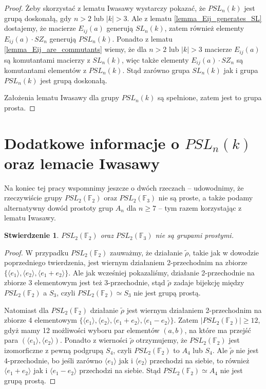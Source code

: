 \documentclass[licencjacka]{pracamgr}
\newtheorem{fact}{Stwierdzenie}[section]
\begin{document}
\begin{proof}
  Żeby skorzystać z lematu Iwasawy wystarczy pokazać, że $PSL_n(k)$ jest grupą doskonałą, 
  gdy $n > 2$ lub $|k| > 3$.
  Ale z lematu \ref{lemma_Eij_generates_SL} dostajemy, że macierze $E_{i j}(a)$ generują $SL_n(k)$,
  zatem również elementy $E_{i j}(a) \cdot SZ_n$ generują $PSL_n(k)$.
  Ponadto z lematu \ref{lemma_Eij_are_commutants} wiemy, że dla $n > 2$ lub $|k| > 3$ macierze $E_{i j}(a)$ 
  są komutantami macierzy z $SL_n(k)$, więc także elementy $E_{i j}(a) \cdot SZ_n$ są komutantami elementów z $PSL_n(k)$.
  Stąd zarówno grupa $SL_n(k)$ jak i grupa $PSL_n(k)$ jest grupą doskonałą.
  
  Założenia lematu Iwasawy dla grupy $PSL_n(k)$ są spełnione, zatem jest to grupa prosta.
\end{proof}

\section{Dodatkowe informacje o $PSL_n(k)$ oraz lemacie Iwasawy}

Na koniec tej pracy wspomnimy jeszcze o dwóch rzeczach -- udowodnimy, że rzeczywiście 
grupy $PSL_2(\mathbb{F}_2)$ oraz $PSL_2(\mathbb{F}_3)$ nie są proste,
a także podamy alternatywny dowód prostoty grup $A_n$ dla $n \ge 7$ -- tym razem korzystając z lematu Iwasawy.

\begin{fact}
  $PSL_2(\mathbb{F}_2)$ oraz $PSL_2(\mathbb{F}_3)$ nie są grupami prostymi.
\end{fact}
\begin{proof}
  W przypadku $PSL_2(\mathbb{F}_2)$ zauważmy, że działanie $\tilde{\rho}$, takie jak w dowodzie poprzedniego twierdzenia,
  jest wiernym działaniem 2-przechodnim na zbiorze  $\{ \langle e_1 \rangle, \langle e_2 \rangle, \langle e_1 + e_2 \rangle\}$.
  Ale jak wcześniej pokazaliśmy, działanie 2-przechodnie na zbiorze 3 elementowym jest też 3-przechodnie, 
  stąd $\tilde{\rho}$ zadaje bijekcję między $PSL_2(\mathbb{F}_2)$ a $S_3$, 
  czyli $PSL_2(\mathbb{F}_2) \simeq S_3$ nie jest grupą prostą.

  Natomiast dla $PSL_2(\mathbb{F}_2)$ działanie $\tilde{\rho}$
  jest wiernym działaniem 2-przechodnim na zbiorze 4 elementowym
  $\{ \langle e_1 \rangle, \langle e_2 \rangle, \langle e_1 + e_2 \rangle, \langle e_1 - e_2 \rangle \}$.
  Zatem $| PSL_2(\mathbb{F}_2) | \ge 12$, gdyż mamy 12 możliwości wyboru par elementów $(a, b)$, 
  na które ma przejść para $(\langle e_1 \rangle, \langle e_2 \rangle)$.
  Ponadto z wierności $\tilde{\rho}$ otrzymujemy, że $PSL_2(\mathbb{F}_2)$ jest izomorficzne z pewną podgrupą $S_4$,
  czyli $PSL_2(\mathbb{F}_2)$ to $A_4$ lub $S_4$.
  Ale $\tilde{\rho}$ nie jest 4-przechodnie, bo jeśli zarówno $\langle e_1 \rangle$ jak i $\langle e_2 \rangle$ przechodzi na siebie,
  to również $\langle e_1 + e_2 \rangle$ jak i $\langle e_1 - e_2 \rangle$ przechodzi na siebie.
  Stąd $PSL_2(\mathbb{F}_2) \simeq A_4$ nie jest grupą prostą.
\end{proof}
\end{document}

